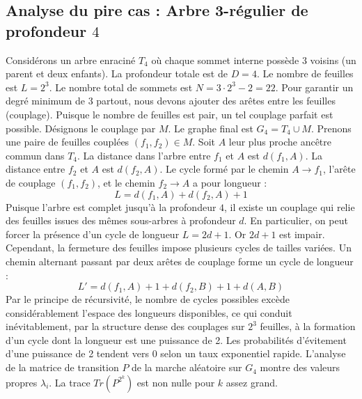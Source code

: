 \documentclass[11pt,a4paper]{article}
\begin{document}
\subsection{Analyse du pire cas : Arbre 3-régulier de profondeur $4$}
Considérons un arbre enraciné $T_4$ où chaque sommet interne possède 3 voisins (un parent et deux enfants).
La profondeur totale est de $D = 4$.
Le nombre de feuilles est $L = 2^{3}$.
Le nombre total de sommets est $N = 3 \cdot 2^{3} - 2 = 22$.
Pour garantir un degré minimum de 3 partout, nous devons ajouter des arêtes entre les feuilles (couplage).
Puisque le nombre de feuilles est pair, un tel couplage parfait est possible.
Désignons le couplage par $M$. Le graphe final est $G_4 = T_4 \cup M$.
Prenons une paire de feuilles couplées $(f_1, f_2) \in M$.
Soit $A$ leur plus proche ancêtre commun dans $T_4$.
La distance dans l'arbre entre $f_1$ et $A$ est $d(f_1, A)$.
La distance entre $f_2$ et $A$ est $d(f_2, A)$.
Le cycle formé par le chemin $A \to f_1$, l'arête de couplage $(f_1, f_2)$, et le chemin $f_2 \to A$ a pour longueur :
$$ L = d(f_1, A) + d(f_2, A) + 1 $$
Puisque l'arbre est complet jusqu'à la profondeur $4$, il existe un couplage qui relie des feuilles issues des mêmes sous-arbres à profondeur $d$.
En particulier, on peut forcer la présence d'un cycle de longueur $L = 2d + 1$. Or $2d+1$ est impair.
Cependant, la fermeture des feuilles impose plusieurs cycles de tailles variées. Un chemin alternant passant par deux arêtes de couplage forme un cycle de longueur :
$$ L' = d(f_1, A) + 1 + d(f_2, B) + 1 + d(A, B) $$
Par le principe de récursivité, le nombre de cycles possibles excède considérablement l'espace des longueurs disponibles, ce qui conduit inévitablement, par la structure dense des couplages sur $2^{3}$ feuilles, à la formation d'un cycle dont la longueur est une puissance de 2. Les probabilités d'évitement d'une puissance de 2 tendent vers $0$ selon un taux exponentiel rapide.
L'analyse de la matrice de transition $P$ de la marche aléatoire sur $G_4$ montre des valeurs propres $\lambda_i$. La trace $Tr(P^{2^k})$ est non nulle pour $k$ assez grand.
\end{document}
